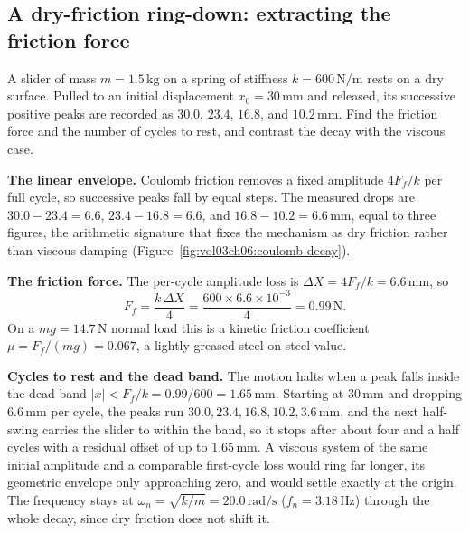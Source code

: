 

\subsection{A dry-friction ring-down: extracting the friction force}

A slider of mass $m = 1.5\,\si{\kilogram}$ on a spring of stiffness
$k = 600\,\si{\newton\per\meter}$ rests on a dry surface. Pulled to an
initial displacement $x_0 = 30\,\si{\milli\meter}$ and released, its
successive positive peaks are recorded as $30.0$, $23.4$, $16.8$, and
$10.2\,\si{\milli\meter}$. Find the friction force and the number of
cycles to rest, and contrast the decay with the viscous case.

\textbf{The linear envelope.} Coulomb friction removes a fixed amplitude
$4F_f/k$ per full cycle, so successive peaks fall by equal steps. The
measured drops are $30.0 - 23.4 = 6.6$, $23.4 - 16.8 = 6.6$, and $16.8 -
10.2 = 6.6\,\si{\milli\meter}$, equal to three figures, the arithmetic
signature that fixes the mechanism as dry friction rather than viscous
damping (Figure~\ref{fig:vol03ch06:coulomb-decay}).



\textbf{The friction force.} The per-cycle amplitude loss is $\Delta X =
4F_f/k = 6.6\,\si{\milli\meter}$, so
\[
F_f = \frac{k\,\Delta X}{4} = \frac{600\times 6.6\times 10^{-3}}{4} =
0.99\,\text{N}.
\]
On a $m g = 14.7\,\text{N}$ normal load this is a kinetic friction
coefficient $\mu = F_f/(mg) = 0.067$, a lightly greased steel-on-steel
value.

\textbf{Cycles to rest and the dead band.} The motion halts when a peak
falls inside the dead band $|x| < F_f/k = 0.99/600 = 1.65\,\si{\milli
\meter}$. Starting at $30\,\si{\milli\meter}$ and dropping $6.6\,\si{
\milli\meter}$ per cycle, the peaks run $30.0, 23.4, 16.8, 10.2, 3.6\,\si{
\milli\meter}$, and the next half-swing carries the slider to within the
band, so it stops after about four and a half cycles with a residual
offset of up to $1.65\,\si{\milli\meter}$. A viscous system of the same
initial amplitude and a comparable first-cycle loss would ring far
longer, its geometric envelope only approaching zero, and would settle
exactly at the origin. The frequency stays at $\omega_n = \sqrt{k/m} =
20.0\,\si{\radian\per\second}$ ($f_n = 3.18\,\si{\hertz}$) through the
whole decay, since dry friction does not shift it.

